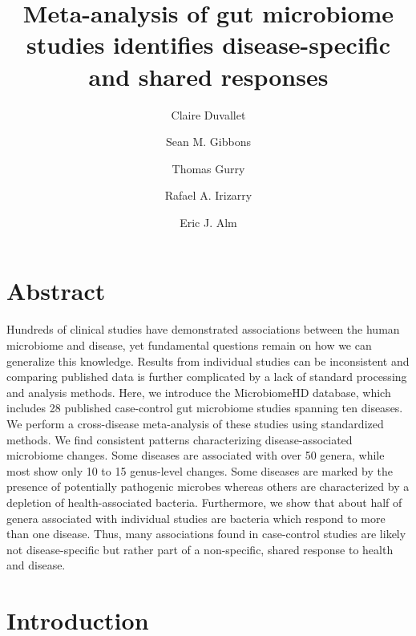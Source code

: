 \documentclass{article}
\begin{document}
\title{Meta-analysis of gut microbiome studies identifies disease-specific and shared responses}
\author[1,2]{Claire Duvallet}
\author[1,2,3]{Sean M. Gibbons}
\author[1,2,3]{Thomas Gurry}
\author[4,5]{Rafael A. Irizarry}
\author[1,2,3,*]{Eric J. Alm}

\maketitle

\section*{Abstract}
Hundreds of clinical studies have demonstrated associations between the human microbiome and disease, yet fundamental questions remain on how we can generalize this knowledge. 
Results from individual studies can be inconsistent and comparing published data is further complicated by a lack of standard processing and analysis methods. 
Here, we introduce the MicrobiomeHD database, which includes 28 published case-control gut microbiome studies spanning ten diseases. 
We perform a cross-disease meta-analysis of these studies using standardized methods. 
We find consistent patterns characterizing disease-associated microbiome changes. 
Some diseases are associated with over 50 genera, while most show only 10 to 15 genus-level changes. 
Some diseases are marked by the presence of potentially pathogenic microbes whereas others are characterized by a depletion of health-associated bacteria. 
Furthermore, we show that about half of genera associated with individual studies are bacteria which respond to more than one disease. 
Thus, many associations found in case-control studies are likely not disease-specific but rather part of a non-specific, shared response to health and disease.

\newpage

\section*{Introduction}
\end{document}
